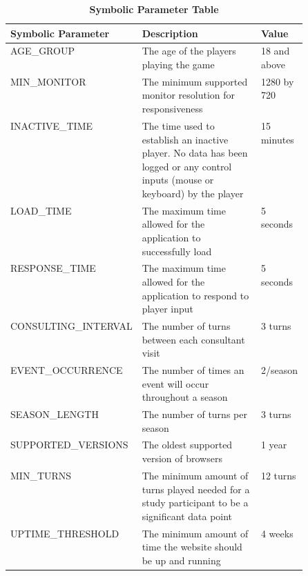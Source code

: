 \documentclass{article}
\begin{document}
\begin{table}[h]
\caption{\bf Symbolic Parameter Table}
\begin{tabular}{|l|p{0.5\linewidth}|l|}
\hline
\multicolumn{1}{|l}{\bfseries Symbolic Parameter} & \multicolumn{1}{|l|}{\bfseries Description} & \multicolumn{1}{l|}{\bfseries Value}\\
\hline
AGE\_GROUP & The age of the players playing the game & 18 and above \\
\hline
MIN\_MONITOR & The minimum supported monitor resolution for responsiveness & 1280 by 720 \\
\hline
INACTIVE\_TIME & The time used to establish an inactive player. No data has been logged or any control inputs (mouse or keyboard) by the player & 15 minutes \\
\hline
LOAD\_TIME & The maximum time allowed for the application to successfully load & 5 seconds \\
\hline
RESPONSE\_TIME & The maximum time allowed for the application to respond to player input & 5 seconds \\
\hline
CONSULTING\_INTERVAL & The number of turns between each consultant visit & 3 turns \\
\hline
EVENT\_OCCURRENCE & The number of times an event will occur throughout a season & 2/season \\
\hline
SEASON\_LENGTH & The number of turns per season & 3 turns \\
\hline
SUPPORTED\_VERSIONS & The oldest supported version of browsers & 1 year \\
\hline
MIN\_TURNS & The minimum amount of turns played needed for a study participant to be a significant data point & 12 turns \\
\hline
UPTIME\_THRESHOLD & The minimum amount of time the website should be up and running & 4 weeks\\
\hline
\end{tabular}
\end{table}
\end{document}

